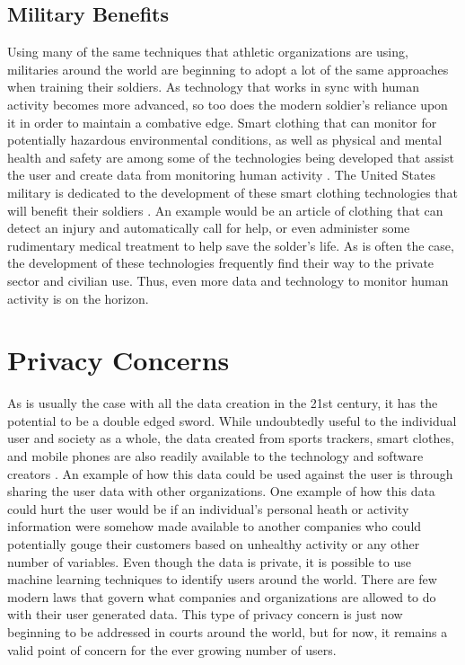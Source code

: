 \documentclass[sigconf]{acmart}
\begin{document}
\subsection{Military Benefits}

Using many of the same techniques that athletic organizations are using, militaries around the world are beginning to adopt a lot of the same approaches when training their soldiers. As technology that works in sync with human activity becomes more advanced, so too does the modern soldier's reliance upon it in order to maintain a combative edge. Smart clothing that can monitor for potentially hazardous environmental conditions, as well as physical and mental health and safety are among some of the technologies being developed that assist the user and create data from monitoring human activity \cite{scataglini2015}. The United States military is dedicated to the development of these smart clothing technologies that will benefit their soldiers \cite{lester2011}. An example would be an article of clothing that can detect an injury and automatically call for help, or even administer some rudimentary medical treatment to help save the solder's life. As is often the case, the development of these technologies frequently find their way to the private sector and civilian use. Thus, even more data and technology to monitor human activity is on the horizon.

\section{Privacy Concerns}

As is usually the case with all the data creation in the 21st century, it has the potential to be a double edged sword. While undoubtedly useful to the individual user and society as a whole, the data created from sports trackers, smart clothes, and mobile phones are also readily available to the technology and software creators \cite{lidynia2017}. An example of how this data could be used against the user is through sharing the user data with other organizations. One example of how this data could hurt the user would be if an individual's personal heath or activity information were somehow made available to another companies who could potentially gouge their customers based on unhealthy activity or any other number of variables. Even though the data is private, it is possible to use machine learning techniques to identify users around the world. There are few modern laws that govern what companies and organizations are allowed to do with their user generated data. This type of privacy concern is just now beginning to be addressed in courts around the world, but for now, it remains a valid point of concern for the ever growing number of users. 
\end{document}
